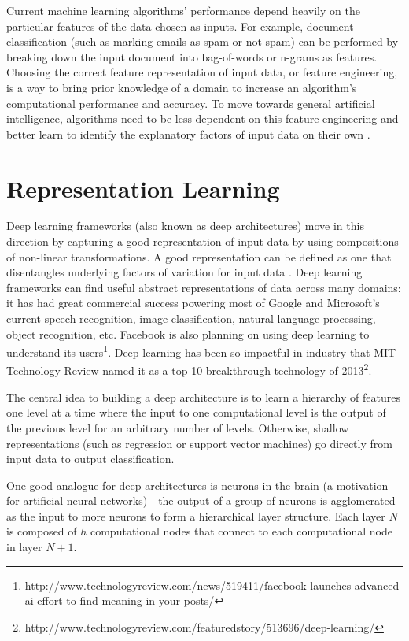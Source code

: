 Current machine learning algorithms' performance depend heavily on the particular features of the data chosen as inputs. For example, document classification (such as marking emails as spam or not spam) can be performed by breaking down the input document into bag-of-words or n-grams as features. Choosing the correct feature representation of input data, or feature engineering, is a way to bring prior knowledge of a domain to increase an algorithm's computational performance and accuracy. To move towards general artificial intelligence, algorithms need to be less dependent on this feature engineering and better learn to identify the explanatory factors of input data on their own \cite{bengio12}.

\section{Representation Learning}
Deep learning frameworks (also known as deep architectures) move in this direction by capturing a good representation of input data by using compositions of non-linear transformations. A good representation can be defined as one that disentangles underlying factors of variation for input data \cite{bengio13}. Deep learning frameworks can find useful abstract representations of data across many domains: it has had great commercial success powering most of Google and Microsoft's current speech recognition, image classification, natural language processing, object recognition, etc. Facebook is also planning on using deep learning to understand its users\footnote{http://www.technologyreview.com/news/519411/facebook-launches-advanced-ai-effort-to-find-meaning-in-your-posts/}. Deep learning has been so impactful in industry that MIT Technology Review named it as a top-10 breakthrough technology of 2013\footnote{http://www.technologyreview.com/featuredstory/513696/deep-learning/}.

The central idea to building a deep architecture is to learn a hierarchy of features one level at a time where the input to one computational level is the output of the previous level for an arbitrary number of levels. Otherwise, shallow representations (such as regression or support vector machines) go directly from input data to output classification.

One good analogue for deep architectures is neurons in the brain (a motivation for artificial neural networks) - the output of a group of neurons is agglomerated as the input to more neurons to form a hierarchical layer structure. Each layer \(N\) is composed of \(h\) computational nodes that connect to each computational node in layer \(N+1\).

